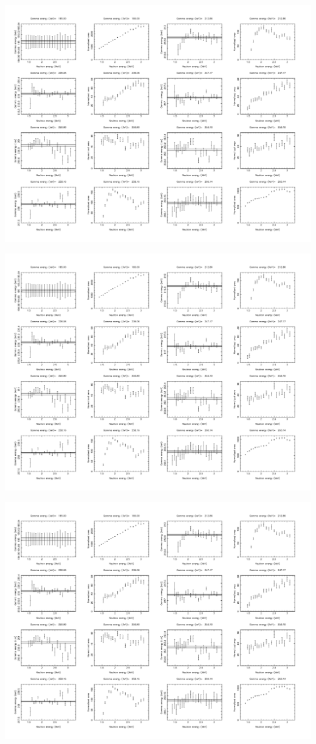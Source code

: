 \begin{center}
\includegraphics[page=29,angle=90,height=0.95\textheight]{162Dy_stitched.pdf}
\end{center}
\begin{center}
\includegraphics[page=30,angle=90,height=0.95\textheight]{162Dy_stitched.pdf}
\end{center}
\begin{center}
\includegraphics[page=31,angle=90,height=0.95\textheight]{162Dy_stitched.pdf}
\end{center}

